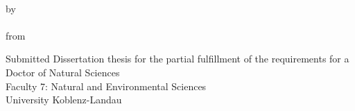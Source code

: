 
\begin{titlepage}
    \begin{center}
        \begingroup
            \vspace{5cm}
            \textbf{\LARGE\spacedallcaps{\myTitleOnTitlePageLineOne}}\\[0.8em]
            \spacedallcaps{\myTitleOnTitlePageLineTwo}
        \endgroup
        
        \vfill

        \begingroup
            by\\[1em]
            \Large \spacedlowsmallcaps{\myName} \\
            \small from \spacedlowsmallcaps{\myLocation}
        \endgroup

        \vfill

        \begingroup
            \small
        	Submitted Dissertation thesis for the partial fulfillment of the requirements for a \\
        	Doctor of Natural Sciences \\
            Faculty 7: Natural and Environmental Sciences \\
        	University Koblenz-Landau
        \endgroup

        \vfill

        \myTime
                   

    \end{center}       
\end{titlepage}   
 
